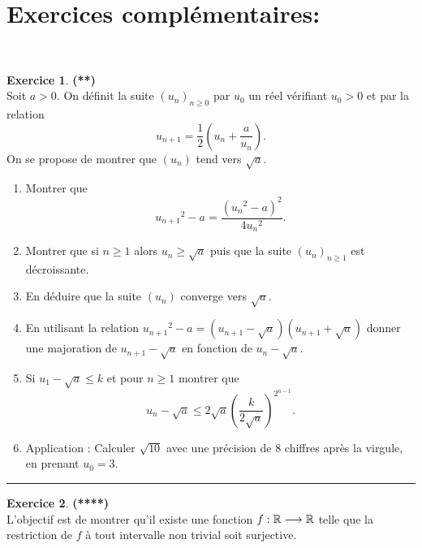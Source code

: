 \documentclass[a4paper,11pt]{article}
\theoremstyle{definition}
\newtheorem{exo}{Exercice} %
\begin{document}
\newpage
\section*{Exercices complémentaires:}\hfill\\%

\begin{minipage}{1\linewidth}
	\begin{minipage}[t]{0.48\linewidth}
		\raggedright
		
\begin{exo}\textbf{(**)}\quad\\[0.2cm]
	
	Soit $a>0$. On d\'efinit la suite $(u_n)_{n\geq 0}$ par
	$u_0$ un r\'eel v\'erifiant $u_0>0$ et par la relation
	$$u_{n+1}= \frac12 \left( u_n+\frac{a}{u_n}\right).$$
	On se propose de montrer que $(u_n)$ tend vers $\sqrt a$.
	\begin{enumerate}
		\item Montrer que
		$${u_{n+1}}^2-a= \frac{({u_n}^2-a)^2}{4{u_n}^2}.$$
		\item Montrer que si $n\geq 1$ alors $u_n \geq \sqrt a$ puis que
		la suite $(u_n)_{n\geq 1}$ est d\'ecroissante.
		\item En d\'eduire que la suite $(u_n)$ converge vers $\sqrt a$.
		\item En utilisant la relation
		${u_{n+1}}^2-a= ({u_{n+1}}-\sqrt{a})({u_{n+1}}+\sqrt{a})$ donner
		une majoration de ${u_{n+1}}-\sqrt{a}$ en fonction de
		${u_{n}}-\sqrt{a}$.
		\item Si $u_1-\sqrt a \leq k$ et pour $n\geq 1$ montrer que
		$$u_n - \sqrt a \leq 2\sqrt a \left( \frac k {2\sqrt a}\right)^{2^{n-1}}.$$
		\item Application : Calculer $\sqrt{10}$ avec une pr\'ecision de 8 chiffres apr\`es la virgule,
		en prenant $u_0 = 3$.
	\end{enumerate}	
	
	\centering
	\rule{1\linewidth}{0.6pt}
\end{exo}
		
		
	\end{minipage}	
	\hfill\vrule\hfill
	\begin{minipage}[t]{0.48\linewidth}
		\raggedright
		
\begin{exo}\textbf{(****)}\quad\\[0.2cm]
	L'objectif est de montrer qu’il existe une fonction $f : \mathbb{R} \longrightarrow \mathbb{R} $ telle que la restriction de $f$ à tout intervalle non trivial soit surjective.
	

\end{exo}
\end{minipage}
\end{minipage}
\end{document}
